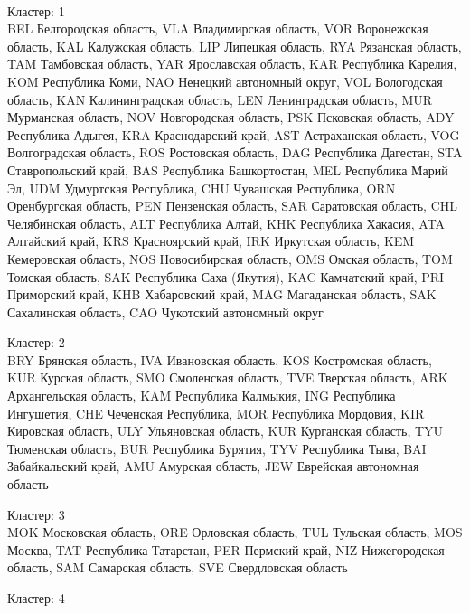 \documentclass[11pt]{article}
\begin{document}
    \begin{center}
    \end{center}
    { \hspace*{\fill} \\}
    
Кластер:  1 \\
BEL Белгородская область, VLA Владимирская область, VOR Воронежская область, KAL Калужская область, LIP Липецкая область, RYA Рязанская область, TAM Тамбовская область, YAR Ярославская область, KAR Республика Карелия, KOM Республика Коми, NAO Ненецкий автономный округ, VOL Вологодская область, KAN Калинингpадская область, LEN Ленинградская область, MUR Мурманская область, NOV Новгородская область, PSK Псковская область, ADY Республика Адыгея, KRA Краснодарский край, AST Астраханская область, VOG Волгоградская область, ROS Ростовская область, DAG Республика Дагестан, STA Ставропольский край, BAS Республика Башкортостан, MEL Республика Марий Эл, UDM Удмуртская Республика, CHU Чувашская Республика, ORN Оренбургская область, PEN Пензенская область, SAR Саратовская область, CHL Челябинская область, ALT Республика Алтай, KHK Республика Хакасия, ATA Алтайский край, KRS Красноярский край, IRK Иркутская область, KEM Кемеровская область, NOS Новосибирская область, OMS Омская область, TOM Томская область, SAK Республика Саха (Якутия), KAC Камчатский край, PRI Приморский край, KHB Хабаровский край, MAG Магаданская область, SAK Сахалинская область, CAO Чукотский автономный округ

Кластер:  2 \\
BRY Брянская область, IVA Ивановская область, KOS Костромская область, KUR Курская область, SMO Смоленская область, TVE Тверская область, ARK Архангельская область, KAM Республика Калмыкия, ING Республика Ингушетия, CHE Чеченская Республика, MOR Республика Мордовия, KIR Кировская область, ULY Ульяновская область, KUR Курганская область, TYU Тюменская область, BUR Республика Бурятия, TYV Республика Тыва, BAI Забайкальский край, AMU Амурская область, JEW Еврейская автономная область

Кластер:  3 \\
MOK Московская область, ORE Орловская область, TUL Тульская область, MOS Москва, TAT Республика Татарстан, PER Пермский край, NIZ Нижегородская область, SAM Самарская область, SVE Свердловская область

Кластер:  4 \\
\end{document}
